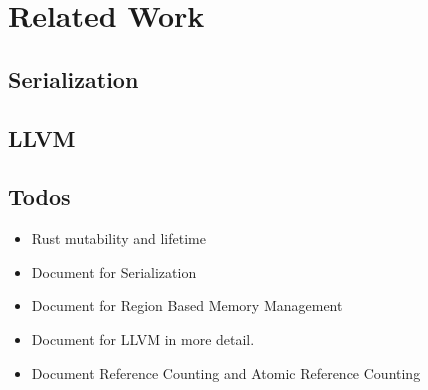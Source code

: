 \chapter{Related Work}
\label{chapter:relatedwork}
\thispagestyle{myheadings}

\graphicspath{{2_RelatedWork/Figures/}}

\label{sec:history}

\clearpage

\section{Serialization}
\label{sec:history}

\clearpage


\section{LLVM}
\label{sec:history}



\section{Todos}
\label{sec:history}
\begin{itemize}
    \item Rust mutability and lifetime
    \item Document for Serialization
    \item Document for Region Based Memory Management
    \item Document for LLVM in more detail.
    \item Document Reference Counting and Atomic Reference Counting
\end{itemize}




